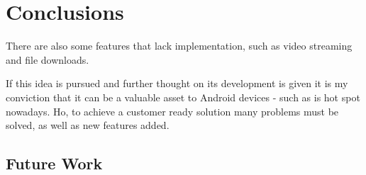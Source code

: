 
\chapter{Conclusions}
\label{chapter:conclusion}

There are also some features that lack implementation, such as video streaming and file downloads.

If this idea is pursued and further thought on its development is given it is my conviction that it can be a valuable asset to Android devices - such as is hot spot nowadays. Ho, to achieve a customer ready solution many problems must be solved, as well as new features added.

\section{Future Work}
